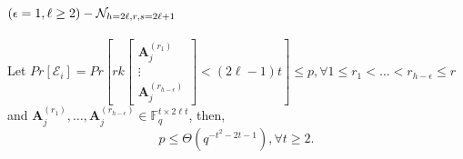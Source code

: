 \section{$\left(\epsilon=1,\ell\protect\geq2\right)-\mathcal{N}_{h=2\ell,r,s=2\ell+1}$}
\begin{lem}
\label{lem:p_e1l2} Let $Pr\left[\mathcal{E}_{i}\right]=Pr\left[rk\left[\begin{array}{c}
\boldsymbol{A}_{j}^{\left(r_{1}\right)}\\
\vdots\\
\boldsymbol{A}_{j}^{\left(r_{h-\epsilon}\right)}
\end{array}\right]<\left(2\ell-1\right)t\right]\leq p,\forall1\leq r_{1}<\ldots<r_{h-\epsilon}\leq r$ and $\boldsymbol{A}_{j}^{\left(r_{1}\right)},\ldots,\boldsymbol{A}_{j}^{\left(r_{h-\epsilon}\right)}\in\ensuremath{\mathbb{F}}_{q}^{t\times2\ell t}$,
then,
\[
p\leq\Theta\left(q^{-t^{2}-2t-1}\right),\forall t\geq2.
\]
\end{lem}
